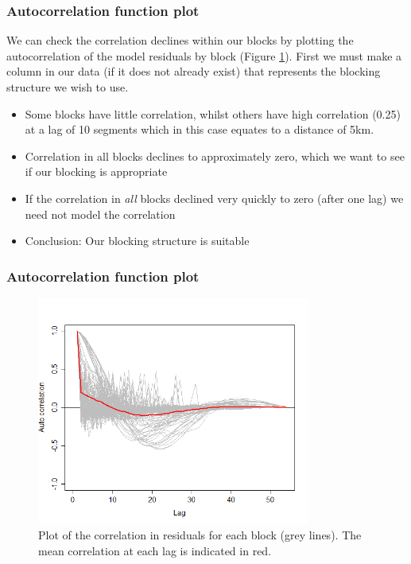 \begin{frame}[fragile]
\frametitle{Autocorrelation function plot}
We can check the correlation declines within our blocks by plotting the autocorrelation of the model residuals by block (Figure \ref{fig:acf}).  First we must make a column in our data (if it does not already exist) that represents the blocking structure we wish to use.

\begin{knitrout}\footnotesize
{}\color{fgcolor}
\end{knitrout}


\begin{itemize}
\item Some blocks have little correlation, whilst others have high correlation (0.25) at a lag of 10 segments which in this case equates to a distance of 5km.
\item Correlation in all blocks declines to approximately zero, which we want to see if our blocking is appropriate
\item If the correlation in \emph{all} blocks declined very quickly to zero (after one lag) we need not model the correlation
\pause
\item Conclusion: Our blocking structure is suitable
\end{itemize}
\end{frame}

\begin{frame}[fragile]
\frametitle{Autocorrelation function plot}
\begin{figure}[h]
  \centering
  \includegraphics[width=9cm]{acfPlot.png}
\caption{Plot of the correlation in residuals for each block (grey lines).  The mean correlation at each lag is indicated in red.}
\label{fig:acf}
\end{figure}
\end{frame}



